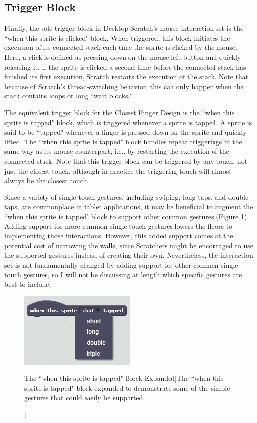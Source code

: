 \subsection{Trigger Block}
Finally, the sole trigger block in Desktop Scratch's mouse interaction set is the ``when this sprite is clicked" block. When triggered, this block initiates the execution of its connected stack each time the sprite is clicked by the mouse. Here, a click is defined as pressing down on the mouse left button and quickly releasing it. If the sprite is clicked a second time before the connected stack has finished its first execution, Scratch restarts the execution of the stack. Note that because of Scratch's thread-switching behavior, this can only happen when the stack contains loops or long ``wait blocks." 

The equivalent trigger block for the Closest Finger Design is the ``when this sprite is tapped" block, which is triggered whenever a sprite is tapped. A sprite is said to be ``tapped" whenever a finger is pressed down on the sprite and quickly lifted. The ``when this sprite is tapped" block handles repeat triggerings in the same way as its mouse counterpart, i.e., by restarting the execution of the connected stack. Note that this trigger block can be triggered by any touch, not just the closest touch, although in practice the triggering touch will almost always be the closest touch.

Since a variety of single-touch gestures, including swiping, long taps, and double taps, are commonplace in tablet applications, it may be beneficial to augment the ``when this sprite is tapped" block to support other common gestures (Figure \ref{When_This_Sprite_Is_Tapped}). Adding support for more common single-touch gestures lowers the floors to implementing those interactions. However, this added support comes at the potential cost of narrowing the walls, since Scratchers might be encouraged to use the supported gestures instead of creating their own. Nevertheless, the interaction set is not fundamentally changed by adding support for other common single-touch gestures, so I will not be discussing at length which specific gestures are best to include.

\begin{figure}
\centering
\includegraphics{images/When_This_Sprite_Is_Tapped.PNG}
\caption[The ``when this sprite is tapped" Block Expanded]{The ``when this sprite is tapped" block expanded to demonstrate some of the simple gestures that could easily be supported.}
\label{When_This_Sprite_Is_Tapped}
\end{figure}

